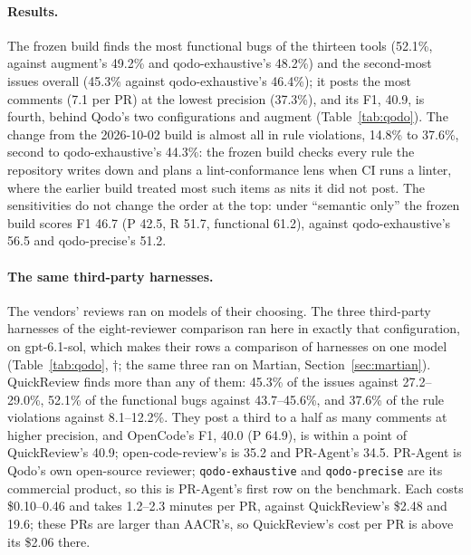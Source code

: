 \documentclass[11pt,a4paper]{article}
\newcommand{\qcr}{QuickReview}
\newcommand{\code}[1]{\texttt{#1}}
\begin{document}
\paragraph{Results.} The frozen build finds the most functional bugs of the
thirteen tools (52.1\%, against augment's 49.2\% and qodo-exhaustive's 48.2\%)
and the second-most issues overall (45.3\% against qodo-exhaustive's
46.4\%); it posts the most comments (7.1 per PR) at the lowest precision
(37.3\%), and its F1, 40.9, is fourth, behind Qodo's two configurations and
augment (Table~\ref{tab:qodo}). The change from the 2026-10-02 build is
almost all in rule violations, 14.8\% to 37.6\%, second to
qodo-exhaustive's 44.3\%: the frozen build checks every rule the repository
writes down and plans a lint-conformance lens when CI runs a linter, where
the earlier build treated most such items as nits it did not post. The
sensitivities do not change the order at the top: under ``semantic only''
the frozen build scores F1 46.7 (P 42.5, R 51.7, functional 61.2), against
qodo-exhaustive's 56.5 and qodo-precise's 51.2.

\paragraph{The same third-party harnesses.} The vendors' reviews ran on
models of their choosing. The three third-party harnesses of the
eight-reviewer comparison ran here in exactly that configuration, on
gpt-6.1-sol, which makes their rows a comparison of harnesses on one model
(Table~\ref{tab:qodo}, $\dagger$; the same three ran on Martian,
Section~\ref{sec:martian}). \qcr{} finds more than any of them: 45.3\% of
the issues against 27.2--29.0\%, 52.1\% of the functional bugs against
43.7--45.6\%, and 37.6\% of the rule violations against 8.1--12.2\%. They
post a third to a half as many comments at higher precision, and OpenCode's
F1, 40.0 (P 64.9), is within a point of \qcr{}'s 40.9; open-code-review's
is 35.2 and PR-Agent's 34.5. PR-Agent is Qodo's own open-source reviewer;
\code{qodo-exhaustive} and \code{qodo-precise} are its commercial product,
so this is PR-Agent's first row on the benchmark. Each costs \$0.10--0.46
and takes 1.2--2.3 minutes per PR, against \qcr{}'s \$2.48 and 19.6; these
PRs are larger than AACR's, so \qcr{}'s cost per PR is above its \$2.06
there.
\end{document}
